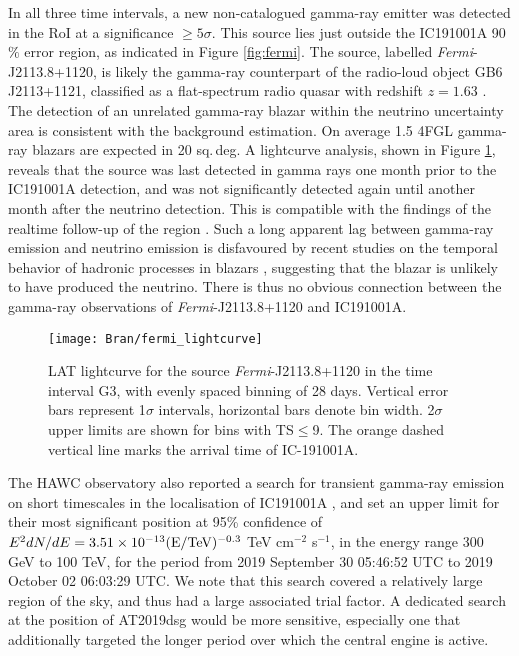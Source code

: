 In all three time intervals, a new non-catalogued gamma-ray emitter was detected in the RoI at a significance $\geq 5 \sigma$. This source lies just outside the IC191001A 90$\%$ error region, as indicated in Figure \ref{fig:fermi}. The source, labelled \textit{Fermi}-J2113.8+1120, is likely the gamma-ray counterpart of the radio-loud object GB6 J2113+1121, classified as a flat-spectrum radio quasar with redshift $z = 1.63$ . The detection of an unrelated gamma-ray blazar within the neutrino uncertainty area is consistent with the background estimation. On average 1.5 4FGL gamma-ray blazars are expected in 20 sq.\,deg. A lightcurve analysis, shown in Figure \ref{fig:fermi_lc}, reveals that the source was last detected in gamma rays one month prior to the IC191001A detection, and was not significantly detected again until another month after the neutrino detection. This is compatible with the findings of the realtime follow-up of the region \cite{ic191001a_fermi}. Such a long apparent lag between gamma-ray emission and neutrino emission is disfavoured by recent studies on the temporal behavior of hadronic processes in blazars , suggesting that the blazar is unlikely to have produced the neutrino. There is thus no obvious connection between the gamma-ray observations of \textit{Fermi}-J2113.8+1120 and IC191001A.

\begin{figure}
	\centering
	\texttt{[image: Bran/fermi\_lightcurve]}
	\caption{LAT lightcurve for the source \textit{Fermi}-J2113.8+1120 in the time interval G3, with evenly spaced binning of 28 days. Vertical error bars represent 1$\sigma$ intervals, horizontal bars denote bin width. 2$\sigma$ upper limits are shown for bins with TS$\leq$9. The orange dashed vertical line marks the arrival time of IC-191001A.}
	\label{fig:fermi_lc}
\end{figure}

The HAWC observatory also reported a search for transient gamma-ray emission on short timescales in the localisation of IC191001A , and set an upper limit for their most significant position at 95\% confidence of $E^{2} dN/dE = 3.51 \times 10^{-13} (\textup{E}/\textup{TeV})^{-0.3}$ TeV cm$^{-2}$ s$^{-1}$, in the energy range 300 GeV to 100 TeV, for the period from 2019 September 30 05:46:52 UTC to 2019 October 02 06:03:29 UTC. We note that this search covered a relatively large region of the sky, and thus had a large associated trial factor. A dedicated search at the position of AT2019dsg would be more sensitive, especially one that additionally targeted the longer period over which the central engine is active.

